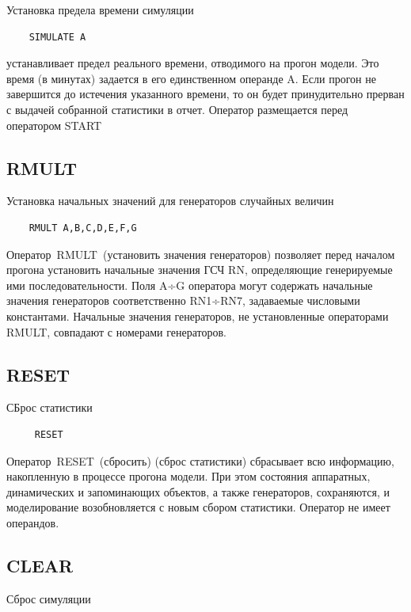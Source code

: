 \documentclass[14pt]{extarticle}
\begin{document}
Установка предела времени симуляции

\begin{lstlisting}
	SIMULATE A
\end{lstlisting}

устанавливает предел реального времени, отводимого на прогон модели. Это время (в минутах) задается в его единственном операнде A. Если прогон не завершится до истечения указанного времени, то он будет принудительно прерван с выдачей собранной статистики в отчет. Оператор размещается перед оператором START


\subsection*{RMULT}

Установка начальных значений для генераторов случайных величин

\begin{lstlisting}
	RMULT A,B,C,D,E,F,G
\end{lstlisting}

Оператор RMULT (установить значения генераторов) позволяет перед началом прогона установить начальные значения ГСЧ RN, определяющие генерируемые ими последовательности. Поля A÷G оператора могут содержать начальные значения генераторов соответственно RN1÷RN7, задаваемые числовыми константами. Начальные значения генераторов, не установленные операторами RMULT, совпадают с номерами генераторов.


\subsection*{RESET}

СБрос статистики

\begin{lstlisting}
	 RESET
\end{lstlisting}

Оператор RESET (сбросить) (сброс статистики) сбрасывает всю информацию, накопленную в процессе прогона модели. При этом состояния аппаратных, динамических и запоминающих объектов, а также генераторов, сохраняются, и моделирование возобновляется с новым сбором статистики. Оператор не имеет операндов.

\subsection*{CLEAR}

Сброс симуляции
\end{document}

